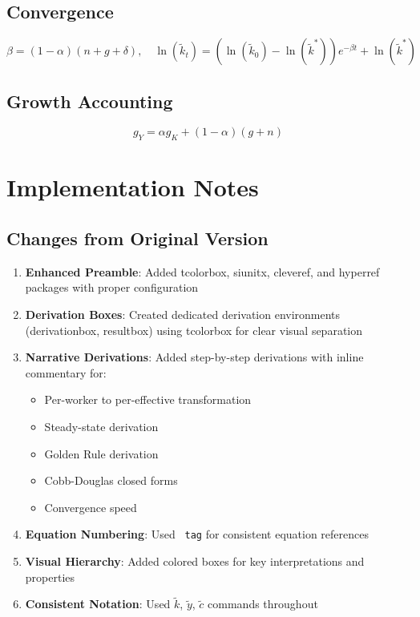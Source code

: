 \documentclass[a4paper,11pt]{article}
\newcommand{\ktilde}{\tilde{k}}
\newcommand{\ytilde}{\tilde{y}}
\newcommand{\ctilde}{\tilde{c}}
\begin{document}
\subsection*{Convergence}
\[
\beta = (1-\alpha)(n+g+\delta), \quad 
\ln(\ktilde_t) = (\ln(\ktilde_0) - \ln(\ktilde^{*}))e^{-\beta t} + \ln(\ktilde^{*})
\]

\subsection*{Growth Accounting}
\[
g_Y = \alpha g_K + (1-\alpha)(g+n)
\]

\clearpage

\section{Implementation Notes}

\subsection*{Changes from Original Version}

\begin{enumerate}
    \item \textbf{Enhanced Preamble}: Added tcolorbox, siunitx, cleveref, and hyperref packages with proper configuration
    \item \textbf{Derivation Boxes}: Created dedicated derivation environments (derivationbox, resultbox) using tcolorbox for clear visual separation
    \item \textbf{Narrative Derivations}: Added step-by-step derivations with inline commentary for:
        \begin{itemize}
            \item Per-worker to per-effective transformation
            \item Steady-state derivation
            \item Golden Rule derivation
            \item Cobb-Douglas closed forms
            \item Convergence speed
        \end{itemize}
    \item \textbf{Equation Numbering}: Used \texttt{\ tag{}} for consistent equation references
    \item \textbf{Visual Hierarchy}: Added colored boxes for key interpretations and properties
    \item \textbf{Consistent Notation}: Used $\ktilde$, $\ytilde$, $\ctilde$ commands throughout
\end{enumerate}
\end{document}
